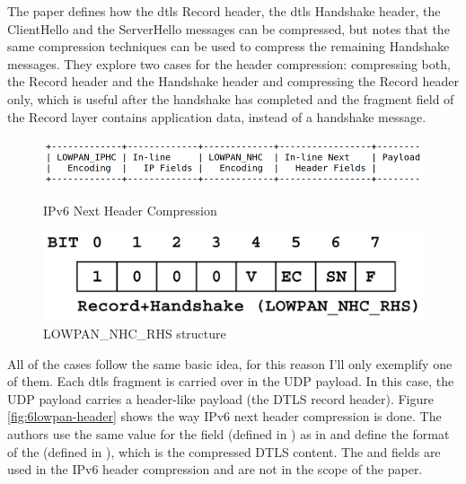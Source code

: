 \documentclass{llncs}
\begin{document}
The paper \cite{6LoWPANC53:online} defines how the \gls{dtls} Record header, the \gls{dtls} Handshake header,
the ClientHello and the ServerHello messages can be compressed, but notes that
the same compression techniques can be used to compress the remaining Handshake
messages. They explore two cases for the header compression: compressing both,
the Record header and the Handshake header and compressing the Record header only,
which is useful after the handshake has completed and the fragment field of the
Record layer contains application data, instead of a handshake message.

\begin{figure}
    \centering
    \begin{minipage}{0.5\textwidth}
        \centering
        \includegraphics[width=1.0\textwidth]{img/6lowpan-header.png} %
        \caption{\label{fig:6lowpan-header} IPv6 Next Header Compression}
    \end{minipage}\hfill
    \begin{minipage}{0.5\textwidth}
        \centering
        \includegraphics[width=1.0\textwidth]{img/6lowpan-ghc-rhs.png} %
        \caption{\label{fig:6lowpan-ghc-rhs} LOWPAN\_NHC\_RHS structure}
    \end{minipage}
\end{figure}


All of the cases follow the same basic idea, for this reason I'll only exemplify
one of them. Each \gls{dtls} fragment is carried over in the UDP payload. In this case,
the UDP payload carries a header-like payload (the DTLS record header).
Figure \ref{fig:6lowpan-header} shows the way IPv6 next header compression is done.
The authors use the same value for the  field (defined in \cite{RFC6282})
as in  and define the format of the 
(defined in \cite{RFC6282}), which is the compressed DTLS content. The 
and  fields are used in the IPv6 header compression
and are not in the scope of the paper.
\end{document}
